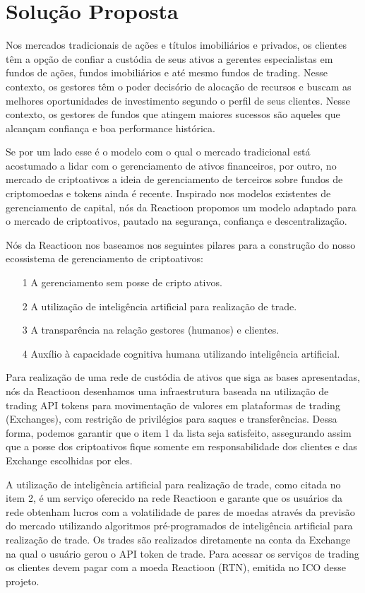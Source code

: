 \documentclass[
	article,			%
	12pt,				%
	oneside,			%
	a4paper,			%
	brazil,				%
	english,
	sumario=tradicional
	]{abntex2}
\begin{document}
\section{Solução Proposta}
Nos mercados tradicionais de ações e títulos imobiliários e privados, os clientes têm a opção de confiar a custódia de seus ativos a gerentes especialistas em fundos de ações, fundos imobiliários e até mesmo fundos de trading. Nesse contexto, os gestores têm o poder decisório de alocação de recursos e buscam as melhores oportunidades de investimento segundo o perfil de seus clientes. Nesse contexto, os gestores de fundos que atingem maiores sucessos são aqueles que alcançam confiança e boa performance histórica.

Se por um lado esse é o modelo com o qual o mercado tradicional está acostumado a lidar com o gerenciamento de ativos financeiros, por outro, no mercado de criptoativos a ideia de gerenciamento de terceiros sobre fundos de criptomoedas e tokens ainda é recente. Inspirado nos modelos existentes de gerenciamento de capital, nós da Reactioon propomos um modelo adaptado para o mercado de criptoativos, pautado na segurança, confiança e descentralização.

Nós da Reactioon nos baseamos nos seguintes pilares para a construção do nosso ecossistema de gerenciamento de criptoativos:


\begin{itemize}
    \item [1] A gerenciamento sem posse de cripto ativos.
    \item [2] A utilização de inteligência artificial para realização de trade.
    \item [3] A transparência na relação gestores (humanos) e clientes.
    \item [4] Auxílio à capacidade cognitiva humana utilizando inteligência artificial.
\end{itemize}

Para realização de uma rede de custódia de ativos que siga as bases apresentadas, nós da Reactioon desenhamos uma infraestrutura baseada na utilização de trading API tokens para movimentação de valores em plataformas de trading (Exchanges), com restrição de privilégios para saques e transferências. Dessa forma, podemos garantir que o item 1 da lista seja satisfeito, assegurando assim que a posse dos criptoativos fique somente em responsabilidade dos clientes e das Exchange escolhidas por eles.

A utilização de inteligência artificial para realização de trade, como citada no item 2, é um serviço oferecido na rede Reactioon e garante que os usuários da rede obtenham lucros com a volatilidade de pares de moedas através da previsão do mercado utilizando algoritmos pré-programados de inteligência artificial para realização de trade. Os trades são realizados diretamente na conta da Exchange na qual o usuário gerou o API token de trade. Para acessar os serviços de trading os clientes devem pagar com a moeda Reactioon (RTN), emitida no ICO desse projeto.   
\end{document}
